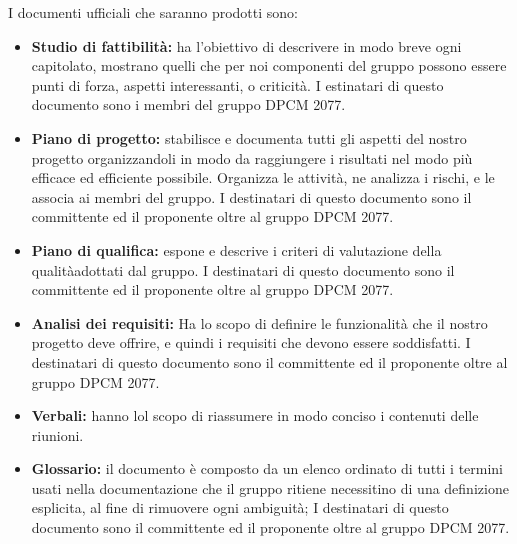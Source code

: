 					I documenti ufficiali che saranno prodotti sono:
					\begin{itemize}
						\item \textbf{Studio di fattibilità:} ha l'obiettivo di descrivere in modo breve ogni capitolato, mostrano quelli che per noi componenti del gruppo possono essere punti di forza, aspetti interessanti, o criticità. I estinatari di questo documento sono i membri del gruppo DPCM 2077.
						\item \textbf{Piano di progetto:} stabilisce e documenta tutti gli aspetti del nostro progetto organizzandoli in modo da raggiungere i risultati nel modo più efficace ed efficiente possibile. Organizza le attività, ne analizza i rischi, e le associa ai membri del gruppo. I destinatari di questo documento sono il committente ed il proponente oltre al gruppo DPCM 2077. 
						\item \textbf{Piano di qualifica:} espone e descrive i criteri di valutazione della qualitàadottati dal gruppo. I destinatari di questo documento sono il committente ed il proponente oltre al gruppo DPCM 2077. 
						\item \textbf{Analisi dei requisiti:} Ha lo scopo di definire le funzionalità che il nostro progetto deve offrire, e quindi i requisiti che devono essere soddisfatti. I destinatari di questo documento sono il committente ed il proponente oltre al gruppo DPCM 2077.
						\item \textbf{Verbali:} hanno lol scopo di riassumere in modo conciso i contenuti delle riunioni.
						\item \textbf{Glossario:} il documento è composto da un elenco ordinato di tutti i termini usati nella documentazione che il gruppo ritiene necessitino di una definizione esplicita, al fine di rimuovere ogni ambiguità; I destinatari di questo documento sono il committente ed il proponente oltre al gruppo DPCM 2077.
					\end{itemize}
					
